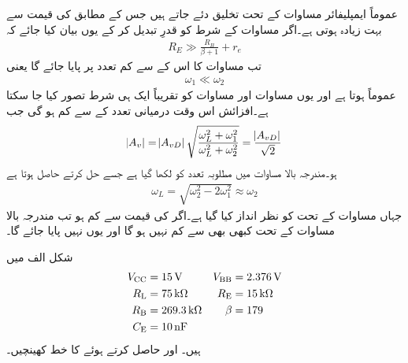 عموماً ایمپلیفائر مساوات  کے تحت تخلیق دئے جاتے ہیں جس کے مطابق  کی قیمت  سے بہت زیادہ ہوتی ہے۔اگر مساوات  کے شرط کو قدرِ تبدیل کر کے یوں بیان کیا جائے کہ
\begin{align} \label{مساوات_تعددی_ردعمل_مخارج_قابو_مزاحمت_کی_شرح}
R_E \gg \frac{R_B}{\beta+1}+r_e
\end{align}
تب مساوات  کا  اس کے  سے کم تعدد پر پایا جائے گا یعنی
\begin{align} \label{مساوات_تعددی_ردعمل_بلند_تعدد_پست_سے_نہایت_زیادہ}
\omega_1 \ll \omega_2
\end{align}
عموماً  ہوتا ہے اور یوں مساوات   اور مساوات  کو تقریباً ایک ہی شرط تصور کیا جا سکتا ہے۔افزائش   اس وقت درمیانی تعدد کے  سے   کم ہو گی جب
\begin{align}
\abs{A_v}=\abs{A_{vD}} \sqrt{\frac{\omega_L^2 + \omega_1^2}{\omega_L^2 +\omega_2^2}}=\frac{\abs{A_{vD}}}{\sqrt{2}}
\end{align}
ہو۔مندرجہ بالا مساوات میں مطلوبہ تعدد کو  لکھا گیا ہے جسے حل کرتے حاصل ہوتا ہے
\begin{align} \label{مساوات_تعددی_ردعمل_پست_انقطاعی_تعدد_سادہ_مساوات}
\omega_L=\sqrt{\omega_2^2 -2 \omega_1^2} \approx \omega_2
\end{align}
جہاں مساوات  کے تحت  کو نظر انداز کیا گیا ہے۔اگر  کی قیمت  سے کم ہو تب مندرجہ بالا مساوات کے تحت  کبھی بھی   سے   کم نہیں ہو گا اور یوں  نہیں پایا جائے گا۔

شکل  الف میں
\begin{align*}
V_{\textup{CC}} &=\SI{15}{\volt} & V_{\textup{BB}} &=\SI{2.376}{\volt} \\
R_{\textup{L}} &=\SI{75}{\kilo \ohm} &  R_{\textup{E}} &=\SI{15}{\kilo \ohm}\\
R_{\textup{B}} &=\SI{269.3}{\kilo \ohm} & \beta &=\num{179}\\
C_{\textup{E}}&=\SI{10}{\nano \farad}
\end{align*}
ہیں۔  اور  حاصل کرتے ہوئے  کا خط کھینچیں۔

